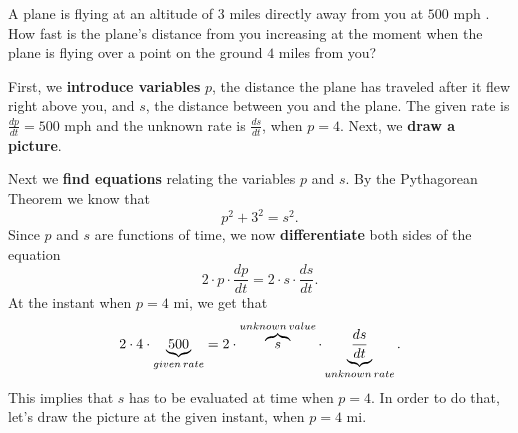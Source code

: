\documentclass{ximera}
\begin{document}
\begin{example}
A plane is flying at an altitude of $3$ miles directly away from you at $500$ mph 
.  How fast is the plane's distance from you increasing at
the moment when the plane is flying over a point on the ground $4$
miles from you?


\begin{explanation}
 First, we \textbf{introduce variables} $p$, the distance the plane has traveled after  it flew right above you, and $s$, the distance between you and the plane. 
The given rate is $\frac{dp}{dt}=500$ mph and the unknown rate is $\frac{ds}{dt}$, when $p=4$.
Next, we \textbf{draw a picture}.
\begin{image}
\end{image}
Next we \textbf{find equations} relating the variables $p$ and $s$. By the Pythagorean Theorem
we know that
\[
p^2+3^2=s^2.
\] 
Since  $p$ and $s$ are functions of time, we now
\textbf{differentiate} both sides of the equation 
\[
2\cdot p\cdot \frac{dp}{dt}  = 2\cdot s \cdot \frac{ds}{dt}.
\] 
At the instant when  $p=4$ mi, we get that
\[
2\cdot4\cdot\underbrace{ 500}_{given\hspace{0.02in}rate}  = 2\cdot \overbrace{s}^{unknown\hspace{0.02in}value} \cdot \underbrace{\frac{ds}{dt}}_{unknown\hspace{0.02in}rate} .
\] 
 This implies that $s$ has to be evaluated at time when $p=4$. In order to do that,
 let's draw the picture at the given instant, when $p=4$ mi.
\begin{image}
\end{image}
\end{explanation}
\end{example}
\end{document}
